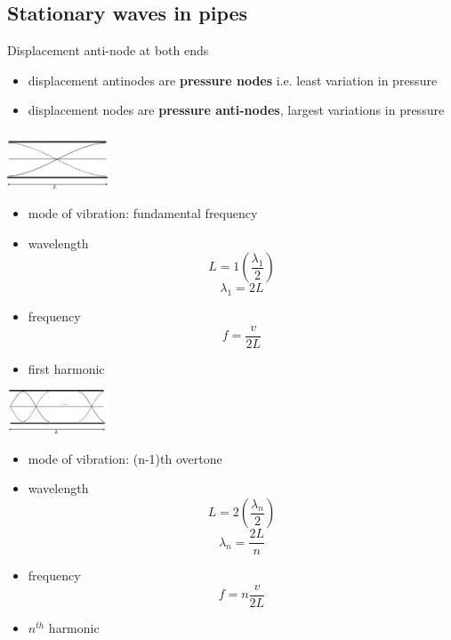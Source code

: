 \documentclass[a4paper, 10pt]{article}
\begin{document}
\subsection{Stationary waves in pipes}
Displacement anti-node at both ends
\begin{itemize}
   \item displacement antinodes are \textbf{pressure nodes} i.e. least variation in pressure
   \item displacement nodes are \textbf{pressure anti-nodes}, largest variations in pressure
\end{itemize}	
\begin{framed}
\begin{minipage}{0.5\textwidth}
   \begin{center}
   \includegraphics[trim = 50 50 50 50, width=3cm]{figures/6.pdf} 
   \end{center}	
\end{minipage}	
\begin{minipage}{0.5\textwidth}
   \begin{itemize}
      \item mode of vibration: fundamental frequency 
      \item wavelength
         \[
            L = 1 \left( \frac{\lambda_1}{2} \right) 
         \]
         \[
         \lambda_1 = 2L
         \]
      \item frequency 
         \[
         f = \frac{v}{2L}
         \]
      \item first harmonic
   \end{itemize}	
\end{minipage}	 
\end{framed}	

\begin{framed}
\begin{minipage}{0.5\textwidth}
   \begin{center}
   \includegraphics[trim = 50 50 50 50, width=3cm]{figures/7.pdf} 
   \end{center}	
\end{minipage}	
\begin{minipage}{0.5\textwidth}
   \begin{itemize}
      \item mode of vibration: (n-1)th overtone 
      \item wavelength
         \[
            L = 2 \left( \frac{\lambda_{n}}{2} \right) 
         \]
         \[
            \lambda_{n} = \frac{2L}{n}
         \]
      \item frequency 
         \[
         f = n \frac{v}{2L}
         \]
      \item $n^{th}$ harmonic
   \end{itemize}	
\end{minipage}	
\end{framed}	
\end{document}
